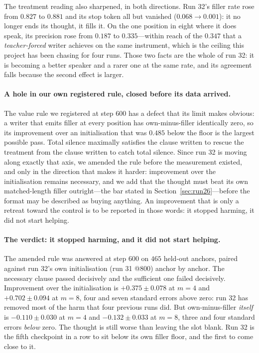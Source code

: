 \documentclass{article} %
\begin{document}
The treatment reading also sharpened, in both directions. Run 32's filler rate rose from $0.827$ to
$0.881$ and its stop token all but vanished ($0.068 \to 0.001$): it no longer ends its thought, it
fills it. On the one position in eight where it does speak, its precision rose from $0.187$ to
$0.335$---within reach of the $0.347$ that a \emph{teacher-forced} writer achieves on the same
instrument, which is the ceiling this project has been chasing for four runs. Those two facts are the
whole of run 32: it is becoming a better speaker and a rarer one at the same rate, and its agreement
falls because the second effect is larger.

\paragraph{A hole in our own registered rule, closed before its data arrived.} The value rule we
registered at step $600$ has a defect that its limit makes obvious: a writer that emits filler at every
position has own-minus-filler identically zero, so its improvement over an initialisation that was
$0.485$ below the floor is the largest possible pass. Total silence maximally satisfies the clause
written to rescue the treatment from the clause written to catch total silence. Since run 32 is moving
along exactly that axis, we amended the rule before the measurement existed, and only in the direction
that makes it harder: improvement over the initialisation remains necessary, and we add that the
thought must beat its own matched-length filler outright---the bar stated in
Section~\ref{sec:run26}---before the format may be described as buying anything. An improvement that
is only a retreat toward the control is to be reported in those words: it stopped harming, it did not
start helping.

\paragraph{The verdict: it stopped harming, and it did not start helping.} The amended rule was
answered at step $600$ on $465$ held-out anchors, paired against run 32's own initialisation
(run 31 @800) anchor by anchor. The necessary clause passed decisively and the sufficient one failed
decisively. Improvement over the initialisation is $+0.375 \pm 0.078$ at $m{=}4$ and
$+0.702 \pm 0.094$ at $m{=}8$, four and seven standard errors above zero: run 32 has removed most of
the harm that four previous runs did. But own-minus-filler \emph{itself} is $-0.110 \pm 0.030$ at
$m{=}4$ and $-0.132 \pm 0.033$ at $m{=}8$, three and four standard errors \emph{below} zero. The
thought is still worse than leaving the slot blank. Run 32 is the fifth checkpoint in a row to sit
below its own filler floor, and the first to come close to it.
\end{document}
